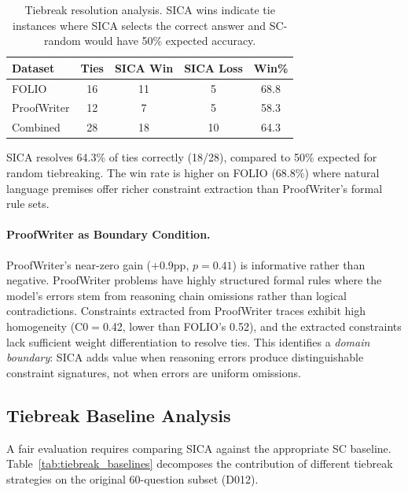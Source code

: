 \documentclass[11pt,a4paper]{article}
\begin{document}
\begin{table}[t]
\centering
\small
\begin{tabular}{lcccc}
\toprule
\textbf{Dataset} & \textbf{Ties} & \textbf{SICA Win} & \textbf{SICA Loss} & \textbf{Win\%} \\
\midrule
FOLIO       & 16 & 11 & 5  & 68.8 \\
ProofWriter & 12 & 7  & 5  & 58.3 \\
\midrule
Combined    & 28 & 18 & 10 & 64.3 \\
\bottomrule
\end{tabular}
\caption{Tiebreak resolution analysis. SICA wins indicate tie instances where SICA selects the correct answer and SC-random would have 50\% expected accuracy.}
\label{tab:tiebreak}
\end{table}

SICA resolves 64.3\% of ties correctly (18/28), compared to 50\% expected for random tiebreaking. The win rate is higher on FOLIO (68.8\%) where natural language premises offer richer constraint extraction than ProofWriter's formal rule sets.

\paragraph{ProofWriter as Boundary Condition.}
ProofWriter's near-zero gain (+0.9pp, $p{=}0.41$) is informative rather than negative. ProofWriter problems have highly structured formal rules where the model's errors stem from reasoning chain omissions rather than logical contradictions. Constraints extracted from ProofWriter traces exhibit high homogeneity (C0$=$0.42, lower than FOLIO's 0.52), and the extracted constraints lack sufficient weight differentiation to resolve ties. This identifies a \emph{domain boundary}: SICA adds value when reasoning errors produce distinguishable constraint signatures, not when errors are uniform omissions.

\subsection{Tiebreak Baseline Analysis}
\label{sec:tiebreak_baseline}

A fair evaluation requires comparing SICA against the appropriate SC baseline. Table~\ref{tab:tiebreak_baselines} decomposes the contribution of different tiebreak strategies on the original 60-question subset (D012).
\end{document}
